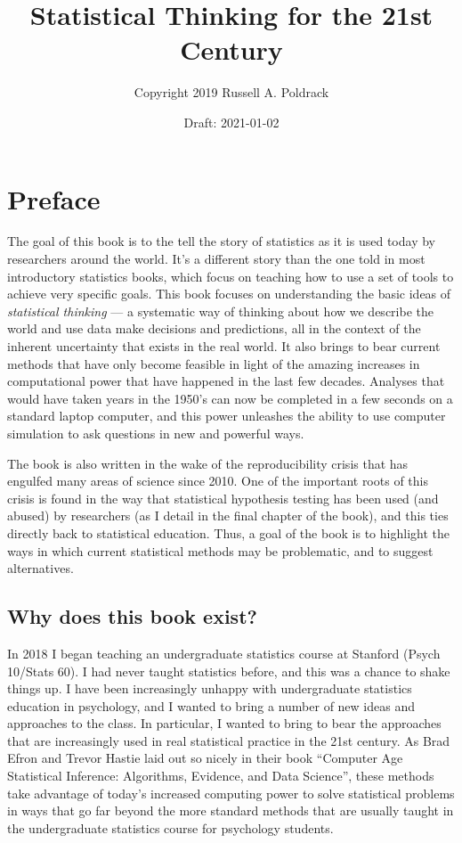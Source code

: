 \documentclass[12pt,]{book}
\title{Statistical Thinking for the 21st Century}
\author{Copyright 2019 Russell A. Poldrack}
\date{Draft: 2021-01-02}
\theoremstyle{definition}
\theoremstyle{definition}
\theoremstyle{definition}
\theoremstyle{remark}
\begin{document}
\maketitle

{
\setcounter{tocdepth}{1}
\tableofcontents
}
\hypertarget{preface}{%
\chapter*{Preface}\label{preface}}

The goal of this book is to the tell the story of statistics as it is used today by researchers around the world. It's a different story than the one told in most introductory statistics books, which focus on teaching how to use a set of tools to achieve very specific goals. This book focuses on understanding the basic ideas of \emph{statistical thinking} --- a systematic way of thinking about how we describe the world and use data make decisions and predictions, all in the context of the inherent uncertainty that exists in the real world. It also brings to bear current methods that have only become feasible in light of the amazing increases in computational power that have happened in the last few decades. Analyses that would have taken years in the 1950's can now be completed in a few seconds on a standard laptop computer, and this power unleashes the ability to use computer simulation to ask questions in new and powerful ways.

The book is also written in the wake of the reproducibility crisis that has engulfed many areas of science since 2010. One of the important roots of this crisis is found in the way that statistical hypothesis testing has been used (and abused) by researchers (as I detail in the final chapter of the book), and this ties directly back to statistical education. Thus, a goal of the book is to highlight the ways in which current statistical methods may be problematic, and to suggest alternatives.

\hypertarget{why-does-this-book-exist}{%
\section{Why does this book exist?}\label{why-does-this-book-exist}}

In 2018 I began teaching an undergraduate statistics course at Stanford (Psych 10/Stats 60). I had never taught statistics before, and this was a chance to shake things up. I have been increasingly unhappy with undergraduate statistics education in psychology, and I wanted to bring a number of new ideas and approaches to the class. In particular, I wanted to bring to bear the approaches that are increasingly used in real statistical practice in the 21st century. As Brad Efron and Trevor Hastie laid out so nicely in their book ``Computer Age Statistical Inference: Algorithms, Evidence, and Data Science'', these methods take advantage of today's increased computing power to solve statistical problems in ways that go far beyond the more standard methods that are usually taught in the undergraduate statistics course for psychology students.
\end{document}
